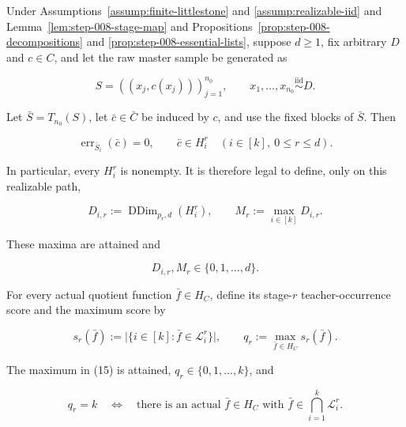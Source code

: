 \begin{lemma}\label{lem:step-009-legal-state}
Under Assumptions~\ref{assump:finite-littlestone} and
\ref{assump:realizable-iid} and Lemma~\ref{lem:step-008-stage-map} and
Propositions~\ref{prop:step-008-decompositions} and
\ref{prop:step-008-essential-lists}, suppose \(d\ge1\), fix arbitrary
\(D\) and \(c\in C\), and let the raw master sample be generated as

\[
 S=((x_j,c(x_j)))_{j=1}^{n_0},
 \qquad x_1,\ldots,x_{n_0}\stackrel{\mathrm{iid}}{\sim}D.
 \tag{11}
\]

Let \(\bar S=T_{n_0}(S)\), let \(\bar c\in\bar C\) be induced by \(c\),
and use the fixed blocks of \(\bar S\). Then

\[
 \operatorname{err}_{\bar S_i}(\bar c)=0,
 \qquad
 \bar c\in H_i^r
 \quad(i\in[k],\ 0\le r\le d).
 \tag{12}
\]

In particular, every \(H_i^r\) is nonempty. It is therefore legal to
define, only on this realizable path,

\[
 D_{i,r}:=\operatorname{DDim}_{p_r,d}(H_i^r),
 \qquad
 M_r:=\max_{i\in[k]}D_{i,r}.
 \tag{13}
\]

These maxima are attained and

\[
 D_{i,r},M_r\in\{0,1,\ldots,d\}.
 \tag{14}
\]

For every actual quotient function \(\bar f\in H_C\), define its
stage-\(r\) teacher-occurrence score and the maximum score by

\[
 s_r(\bar f):=
 \bigl|\{i\in[k]:\bar f\in\mathcal L_i^r\}\bigr|,
 \qquad
 q_r:=\max_{\bar f\in H_C}s_r(\bar f).
 \tag{15}
\]

The maximum in (15) is attained, \(q_r\in\{0,1,\ldots,k\}\), and

\[
 q_r=k
 \quad\Longleftrightarrow\quad
 \text{there is an actual }\bar f\in H_C
 \text{ with }\bar f\in\bigcap_{i=1}^k\mathcal L_i^r.
 \tag{16}
\]


\end{lemma}

